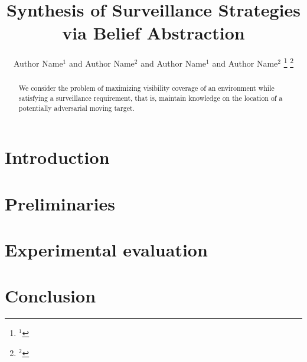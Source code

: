 \documentclass[letterpaper, 10 pt, conference]{ieeeconf}  %
\title{\LARGE \bf Synthesis of Surveillance Strategies via Belief Abstraction}
\author{Author Name$^{1}$ and Author Name$^{2}$ and Author Name$^{1}$ and Author Name$^{2}$ %
\thanks{$^{1}$}%
\thanks{$^{2}$}%
}
\begin{document}
\maketitle
\thispagestyle{empty}
\pagestyle{empty}

\begin{abstract}

We consider the problem of maximizing visibility coverage of an environment while satisfying a surveillance requirement, that is, maintain knowledge on the location of a potentially adversarial moving target.

\end{abstract}

\section{Introduction}

\section{Preliminaries}







\section{Experimental evaluation}

\section{Conclusion}



\end{document}
